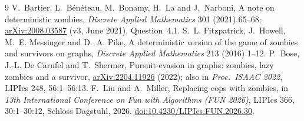 \documentclass[11pt,a4paper]{article}
\theoremstyle{plain}
\theoremstyle{definition}
\theoremstyle{remark}
\begin{document}


\begin{thebibliography}{9}
\small
{} V.~Bartier, L.~Bénéteau, M.~Bonamy, H.~La and J.~Narboni, A note on deterministic zombies, \emph{Discrete Applied Mathematics} 301 (2021) 65--68; \href{https://arxiv.org/abs/2008.03587}{arXiv:2008.03587} (v3, June 2021). Question~4.1.
 S.~L. Fitzpatrick, J.~Howell, M.~E. Messinger and D.~A. Pike, A deterministic version of the game of zombies and survivors on graphs, \emph{Discrete Applied Mathematics} 213 (2016) 1--12.
 P.~Bose, J.-L. De Carufel and T.~Shermer, Pursuit-evasion in graphs: zombies, lazy zombies and a survivor, \href{https://arxiv.org/abs/2204.11926}{arXiv:2204.11926} (2022); also in \emph{Proc.\ ISAAC 2022}, LIPIcs 248, 56:1--56:13.
 F.~Liu and A.~Miller, Replacing cops with zombies, in \emph{13th International Conference on Fun with Algorithms (FUN 2026)}, LIPIcs 366, 30:1--30:12, Schloss Dagstuhl, 2026. \href{https://doi.org/10.4230/LIPIcs.FUN.2026.30}{doi:10.4230/LIPIcs.FUN.2026.30}.
\end{thebibliography}
\end{document}
